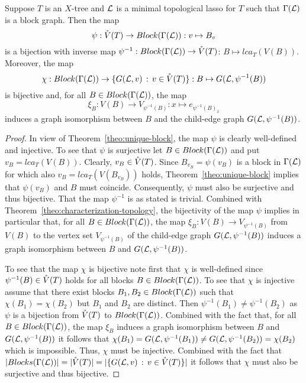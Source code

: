 \begin{cor}\label{cor:bijection}
Suppose $T$ is an $X$-tree and ${\mathcal L}$ is a minimal topological lasso for
$T$ such that $\Gamma({\mathcal L})$ is a block graph. Then the map
$$
\psi:\mathring{V}(T)\to Block(\Gamma({\mathcal L})) : v\mapsto B_v
$$
is a bijection with inverse map $\psi^{-1}:Block(\Gamma({\mathcal L}))\to \mathring{V}(T)$: 
$B\mapsto lca_T(V(B))$. Moreover, the map
$$
\chi:Block(\Gamma({\mathcal L})) \to \{G({\mathcal L}, v)\,:\, v\in \mathring{V}(T)\}
: B\mapsto G({\mathcal L},\psi^{-1}(B))
$$
is bijective and,
 for all $B\in Block(\Gamma({\mathcal L}))$, the map
$$
\xi_B:V(B) \to V_{\psi^{-1}(B)} 
: x\mapsto e_{\psi^{-1}(B)_x}
$$ 
induces a graph isomorphism between $B$ and the child-edge
graph $G({\mathcal L}, \psi^{-1}(B))$.
\end{cor}
\begin{proof}
In view of Theorem~\ref{theo:unique-block}, the map $\psi$ is clearly
well-defined and injective. To see that $\psi$ is surjective
let $B\in Block(\Gamma({\mathcal L}))$ and put $v_B=lca_T(V(B))$. Clearly,
$v_B\in \mathring{V}(T)$. Since 
$B_{v_B}=\psi(v_B)$ is a block in $\Gamma({\mathcal L})$ for which also
$v_B=lca_T(V(B_{v_B}))$
 holds, Theorem~\ref{theo:unique-block} 
 implies that $\psi(v_B)$ and $B$ must coincide.
Consequently, $\psi$ must also be surjective and thus bijective. That
the map $\psi^{-1}$ is as stated is trivial.
Combined with Theorem~\ref{theo:characterization-topology}, 
the bijectivity of the map $\psi$ implies in particular that, 
for all $B\in Block(\Gamma({\mathcal L}))$,
the map $\xi_B: V(B) \to V_{\psi^{-1}(B)}  $ 
from $V(B)$ to the vertex set $V_{\psi^{-1}(B)}  $
of the child-edge graph $G({\mathcal L}, \psi^{-1}(B))$ induces a graph
isomorphism between $B$ and $G({\mathcal L}, \psi^{-1}(B))$.

To see that the map $\chi$ is bijective 
note first that $\chi$ is well-defined
since $\psi^{-1}(B)\in \mathring{V}(T)$ holds 
for all blocks $B\in Block(\Gamma({\mathcal L}))$. To see that $\chi$ is
injective assume that there exist blocks $B_1,B_2\in Block(\Gamma({\mathcal L}))$
such that $\chi(B_1)=\chi(B_2)$ but $B_1$ and $B_2$ are distinct.
Then $\psi^{-1}(B_1)\not= \psi^{-1}(B_2)$ as $\psi$ is a bijection from
$\mathring{V}(T)$ to  $Block(\Gamma({\mathcal L})) $.
Combined with the fact that, for all
$B\in Block(\Gamma({\mathcal L}))$, the map $\xi_B$  induces a graph
isomorphism between $B$ and $G({\mathcal L}, \psi^{-1}(B))$
it follows that 
$\chi(B_1)=G({\mathcal L},\psi^{-1}(B_1))\not=G({\mathcal L},\psi^{-1}(B_2))=\chi(B_2)$ 
which is impossible. Thus, $\chi$ must be injective. Combined with the
fact that
$|Blocks(\Gamma({\mathcal L}))|=|\mathring{V}(T)|=|\{G({\mathcal L}, v)\,:\, v\in \mathring{V}(T)\}|$
it follows that $\chi$ must also be surjective and thus bijective.
\qquad \end{proof}

